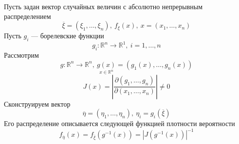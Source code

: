 Пусть задан вектор случайных величин с абсолютно непрерывным распределением
\[
	\overline{\xi} = (\xi_1, \ldots, \xi_n), \ f_{\xi} (x), \ x = (x_1, \ldots, x_n)
\]
Пусть $g_i$ --- борелевские функции
\[
	g_i: \mathbb{R}^n \to \mathbb{R}^1, \ i = 1, \ldots, n
\]
Рассмотрим
\[
	g : \mathbb{R}^n \to \mathbb{R}^n, \ \underset{x \in \mathbb{R}^n}{g(x)} = (g_1(x), \ldots, g_n(x))
\]
\[
	J(x) = \left| \frac{\partial(g_1, \ldots, g_n)}{\partial(x_1, \ldots, x_n)} \right| \neq 0
\]
Сконструируем вектор
\[
	\overline{\eta} = (\eta_1, \ldots, \eta_n), \ \eta_i = g_i (\overline{\xi})
\]
Его распределение описывается следующей функцией плотности вероятности
\[
	f_{\overline{\eta}} (x) = f_{\overline{\xi}} (g^{-1}(x)) = |J(g^{-1}(x))|^{-1}
\]
